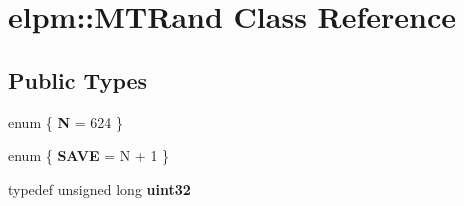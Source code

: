 \hypertarget{classelpm_1_1_m_t_rand}{\section{elpm\+:\+:M\+T\+Rand Class Reference}
\label{classelpm_1_1_m_t_rand}
}
\subsection*{Public Types}
\begin{DoxyCompactItemize}
\item 
\hypertarget{classelpm_1_1_m_t_rand_ab33b4383b2f6613170be5ebe77b26c20}{enum \{ {\bfseries N} = 624
 \}}\label{classelpm_1_1_m_t_rand_ab33b4383b2f6613170be5ebe77b26c20}

\item 
\hypertarget{classelpm_1_1_m_t_rand_ab6ee2cc75e348cbc817b1ff247951e46}{enum \{ {\bfseries S\+A\+V\+E} = N + 1
 \}}\label{classelpm_1_1_m_t_rand_ab6ee2cc75e348cbc817b1ff247951e46}

\item 
\hypertarget{classelpm_1_1_m_t_rand_a4c8ad7b3eb48b94d0d8140c44efd10dc}{typedef unsigned long {\bfseries uint32}}\label{classelpm_1_1_m_t_rand_a4c8ad7b3eb48b94d0d8140c44efd10dc}

\end{DoxyCompactItemize}
